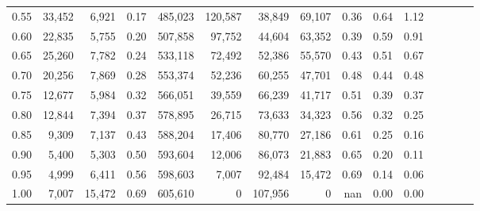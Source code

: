 \begin{tabular}{rrrcrrrrrrrrrrr}
0.55 &  33,452 &   6,921 &                                       0.17 &  485,023 &  120,587 &   38,849 &   69,107 &  0.36 &  0.64 &                         1.12 \\
0.60 &  22,835 &   5,755 &                                       0.20 &  507,858 &   97,752 &   44,604 &   63,352 &  0.39 &  0.59 &                         0.91 \\
0.65 &  25,260 &   7,782 &                                       0.24 &  533,118 &   72,492 &   52,386 &   55,570 &  0.43 &  0.51 &                         0.67 \\
0.70 &  20,256 &   7,869 &                                       0.28 &  553,374 &   52,236 &   60,255 &   47,701 &  0.48 &  0.44 &                         0.48 \\
0.75 &  12,677 &   5,984 &                                       0.32 &  566,051 &   39,559 &   66,239 &   41,717 &  0.51 &  0.39 &                         0.37 \\
0.80 &  12,844 &   7,394 &                                       0.37 &  578,895 &   26,715 &   73,633 &   34,323 &  0.56 &  0.32 &                         0.25 \\
0.85 &   9,309 &   7,137 &                                       0.43 &  588,204 &   17,406 &   80,770 &   27,186 &  0.61 &  0.25 &                         0.16 \\
0.90 &   5,400 &   5,303 &                                       0.50 &  593,604 &   12,006 &   86,073 &   21,883 &  0.65 &  0.20 &                         0.11 \\
0.95 &   4,999 &   6,411 &                                       0.56 &  598,603 &    7,007 &   92,484 &   15,472 &  0.69 &  0.14 &                         0.06 \\
1.00 &   7,007 &  15,472 &                                       0.69 &  605,610 &        0 &  107,956 &        0 &   nan &  0.00 &                         0.00 \\
\bottomrule
\end{tabular}
